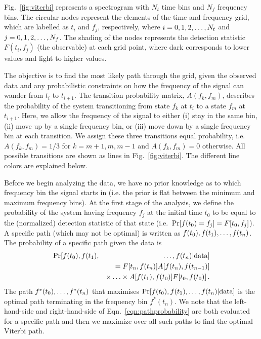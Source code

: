 \documentclass[paper-main.tex]{subfiles}
\begin{document}
Fig.~\ref{fig:viterbi} represents a spectrogram with $N_t$ time bins and $N_f$ frequency bins.
The circular nodes represent the elements of the time and frequency grid, which are labelled as  
$t_i$ and $f_j$, respectively, where $i=0,1,2,\mathellipsis,N_t$ and $j=0,1,2,\mathellipsis,N_f$. 
The shading of the nodes represents the detection statistic $F(t_i,f_j)$ (the observable) at each grid point, where dark corresponds to lower values and light to higher values. 


The objective is to find the most likely path through the grid, given the observed data and any probabilistic constraints on how the frequency of the signal can wander from $t_i$ to $t_{i+1}$. 
The transition probability matrix, $A(f_k,f_m)$, describes the probability of the system transitioning from state $f_k$ at $t_i$ to a state $f_{m}$ at $t_{i+1}$. 
Here, we allow the frequency of the signal to either (i) stay in the same bin, (ii) move up by a single frequency bin, or (iii) move down by a single frequency bin at each transition. 
We assign these three transitions equal probability, i.e.\ $A(f_k,f_m)=1/3$ for $k=m+1,m,m-1$ and $A(f_k,f_m)=0$ otherwise.
All possible transitions are shown as lines in Fig.~\ref{fig:viterbi}.
The different line colors are explained below. 


Before we begin analyzing the data, we have no prior knowledge as to which frequency bin the signal starts in (i.e. the prior is flat between the minimum and maximum frequency bins).
At the first stage of the analysis, we define the probability of the system having frequency $f_j$ at the initial time $t_0$ to be equal to the (normalized) detection statistic of that state (i.e.\  ${\rm Pr}[f(t_0) = f_j] = F[t_0,f_j]$).
A specific path (which may not be optimal) is written as $f(t_0), f(t_1),\mathellipsis, f(t_n)$. 
The probability of a specific path given the data is 
\begin{eqnarray}
{\rm Pr}[ f(t_0), f(t_1),&&\mathellipsis, f(t_n) | {\rm data}] \nonumber\\
          && =F[t_n,f(t_n)] A[f(t_n),f(t_{n-1})] \nonumber \\
          && \times\mathellipsis\times A[f(t_1),f(t_0)] F[t_0,f(t_0)] \,.
\label{eqn:pathprobability}
\end{eqnarray}
The path $f^\ast(t_0),\mathellipsis,f^\ast(t_n)$ that maximises ${\rm Pr}[ f(t_0), f(t_1),\mathellipsis, f(t_n) | {\rm data}]$ is the optimal path terminating in the frequency bin $f^\ast(t_n)$. 
We note that the left-hand-side and right-hand-side of Eqn.~\ref{eqn:pathprobability} are both evaluated for a specific path and then we maximize over all such paths to find the optimal Viterbi path. 
\end{document}
